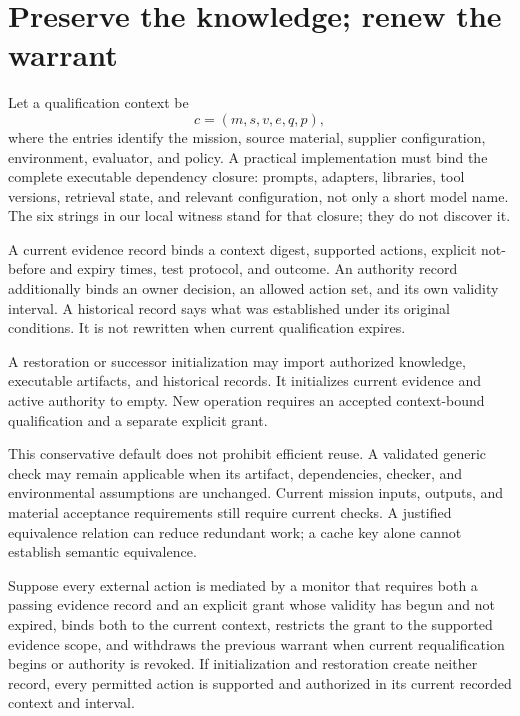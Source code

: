 \section{Preserve the knowledge; renew the warrant}
\label{sec:evidence}
Let a qualification context be
\begin{equation}
 c=(m,s,v,e,q,p),
\end{equation}
where the entries identify the mission, source material, supplier configuration, environment, evaluator, and policy. A practical implementation must bind the complete executable dependency closure: prompts, adapters, libraries, tool versions, retrieval state, and relevant configuration, not only a short model name. The six strings in our local witness stand for that closure; they do not discover it.

A current evidence record binds a context digest, supported actions, explicit not-before and expiry times, test protocol, and outcome. An authority record additionally binds an owner decision, an allowed action set, and its own validity interval. A historical record says what was established under its original conditions. It is not rewritten when current qualification expires.

\begin{definition}
A restoration or successor initialization may import authorized knowledge, executable artifacts, and historical records. It initializes current evidence and active authority to empty. New operation requires an accepted context-bound qualification and a separate explicit grant.
\end{definition}

This conservative default does not prohibit efficient reuse. A validated generic check may remain applicable when its artifact, dependencies, checker, and environmental assumptions are unchanged. Current mission inputs, outputs, and material acceptance requirements still require current checks. A justified equivalence relation can reduce redundant work; a cache key alone cannot establish semantic equivalence.

\begin{proposition}
\label{prop:authority}
Suppose every external action is mediated by a monitor that requires both a passing evidence record and an explicit grant whose validity has begun and not expired, binds both to the current context, restricts the grant to the supported evidence scope, and withdraws the previous warrant when current requalification begins or authority is revoked. If initialization and restoration create neither record, every permitted action is supported and authorized in its current recorded context and interval.
\end{proposition}

